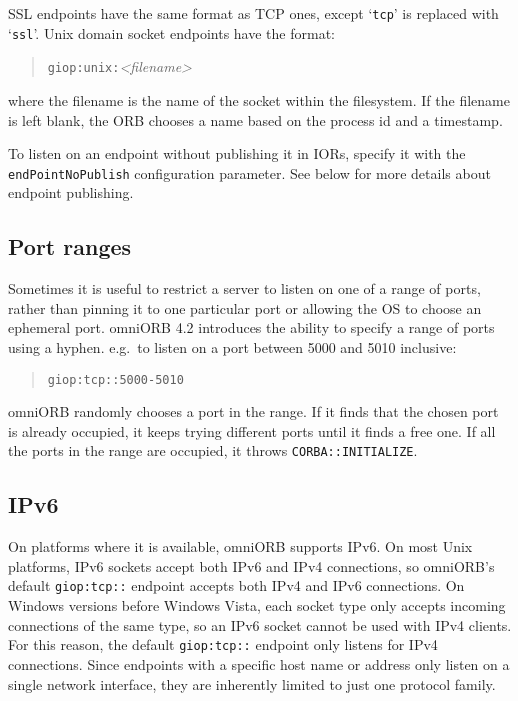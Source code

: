 \documentclass[11pt,oneside,a4paper]{book}
\newcommand{\code}[1]{\texttt{#1}}
\begin{document}
SSL endpoints have the same format as TCP ones, except `\code{tcp}'
is replaced with `\code{ssl}'. Unix domain socket endpoints have the
format:

\begin{quote}
\code{giop:unix:}\textit{<filename>}
\end{quote}

\noindent where the filename is the name of the socket within the
filesystem. If the filename is left blank, the ORB chooses a name
based on the process id and a timestamp.

To listen on an endpoint without publishing it in IORs, specify it
with the \code{endPointNoPublish} configuration parameter. See below
for more details about endpoint publishing.


\subsection{Port ranges}

Sometimes it is useful to restrict a server to listen on one of a
range of ports, rather than pinning it to one particular port or
allowing the OS to choose an ephemeral port. omniORB 4.2 introduces
the ability to specify a range of ports using a hyphen. e.g.\ to
listen on a port between 5000 and 5010 inclusive:

\begin{quote}
\code{giop:tcp::5000-5010}
\end{quote}

omniORB randomly chooses a port in the range. If it finds that the
chosen port is already occupied, it keeps trying different ports until
it finds a free one. If all the ports in the range are occupied, it
throws \code{CORBA::INITIALIZE}.


\subsection{IPv6}

On platforms where it is available, omniORB supports IPv6. On most
Unix platforms, IPv6 sockets accept both IPv6 and IPv4 connections, so
omniORB's default \code{giop:tcp::} endpoint accepts both IPv4 and
IPv6 connections. On Windows versions before Windows Vista, each
socket type only accepts incoming connections of the same type, so an
IPv6 socket cannot be used with IPv4 clients. For this reason, the
default \code{giop:tcp::} endpoint only listens for IPv4 connections.
Since endpoints with a specific host name or address only listen on a
single network interface, they are inherently limited to just one
protocol family.
\end{document}
